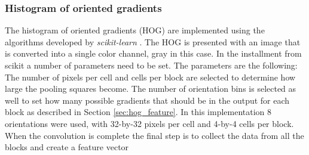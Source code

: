 \subsubsection{Histogram of oriented gradients}
\label{sec:meth:featextr:hog}

The histogram of oriented gradients (HOG) are implemented using the algorithms developed by \emph{scikit-learn} \cite{scikitlearn}. The HOG is presented with an image that is converted into a single color channel, gray in this case. In the installment from scikit a number of parameters need to be set. The parameters are the following: The number of pixels per cell and cells per block are selected to determine how large the pooling squares become. The number of orientation bins is selected as well to set how many possible gradients that should be in the output for each block as described in Section \ref{sec:hog_feature}. In this implementation 8 orientations were used, with 32-by-32 pixels per cell and 4-by-4 cells per block. When the convolution is complete the final step is to collect the data from all the blocks and create a feature vector